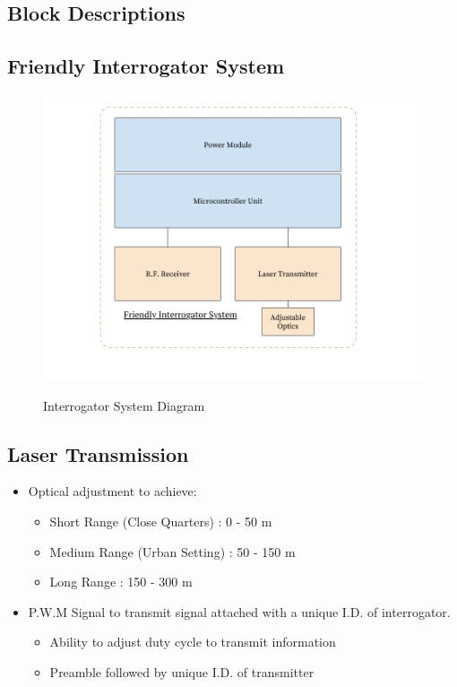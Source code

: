 \documentclass[openbib,letterpaper,10pt]{article}
\begin{document}
\begin{spacing}{1.15}
\subsection{Block Descriptions}
\subsection*{Friendly Interrogator System}
\begin{figure} [H]
	\centering
	\includegraphics[scale=0.35]{Interrogator_Diagram.png}
	\label{fig:system-diagram}
	\vspace{-10mm}
	\caption{Interrogator System Diagram}
\end{figure}

\subsection*{{\normalsize Laser Transmission}}
\begin{itemize}
	\item Optical adjustment to achieve:
	\begin{itemize}
		\item Short Range (Close Quarters) : 0 - 50 m
		\item Medium Range (Urban Setting) : 50 - 150 m
		\item Long Range : 150 - 300 m
	\end{itemize}
	\item P.W.M Signal to transmit signal attached with a unique I.D. of interrogator.
		\begin{itemize}
			\item Ability to adjust duty cycle to transmit information 
			\item Preamble followed by unique I.D. of transmitter
		\end{itemize}
\end{itemize}


\end{spacing}
\end{document}
